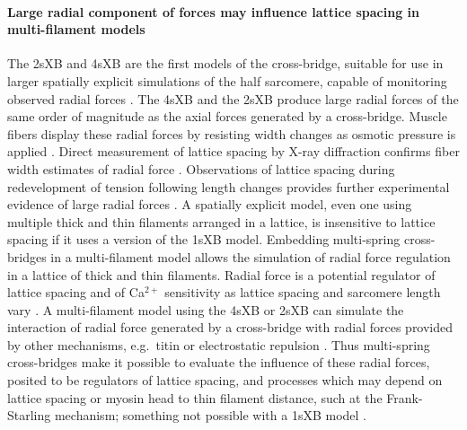 \documentclass[10pt]{article}
\newcommand{\citep}[1]{\cite{#1}} %
\begin{document}
\paragraph{Large radial component of forces may influence lattice spacing in multi-filament models} %
The 2sXB and 4sXB are the first models of the cross-bridge, suitable for use in larger spatially explicit simulations of the half sarcomere, capable of monitoring observed radial forces \citep{Maughan1981, Cecchi1990, Millman1998}. 
The 4sXB and the 2sXB produce large radial forces of the same order of magnitude as the axial forces generated by a cross-bridge. 
Muscle fibers display these radial forces by resisting width changes as osmotic pressure is applied \citep{Maughan1981}.
Direct measurement of lattice spacing by X-ray diffraction confirms fiber width estimates of radial force \citep{Matsubara1984}.
Observations of lattice spacing during redevelopment of tension following length changes provides further experimental evidence of large radial forces \citep{Cecchi1990}. %
A spatially explicit model, even one using multiple thick and thin filaments arranged in a lattice, is insensitive to lattice spacing if it uses a version of the 1sXB model.  
Embedding multi-spring cross-bridges in a multi-filament model allows the simulation of radial force regulation in a lattice of thick and thin filaments.  
Radial force is a potential regulator of lattice spacing and of Ca$^{2+}$ sensitivity as lattice spacing and sarcomere length vary \citep{Millman1998}.  
A multi-filament model using the 4sXB or 2sXB can simulate the interaction of radial force generated by a cross-bridge with radial forces provided by other mechanisms, e.g.\ titin or electrostatic repulsion \citep{Martyn2004, Cazorla2001, Millman1998}. 
Thus multi-spring cross-bridges make it possible to evaluate the influence of these radial forces, posited to be regulators of lattice spacing, and processes which may depend on lattice spacing or myosin head to thin filament distance, such at the Frank-Starling mechanism; something not possible with a 1sXB model \citep{Smith2009}. 

\end{document}
